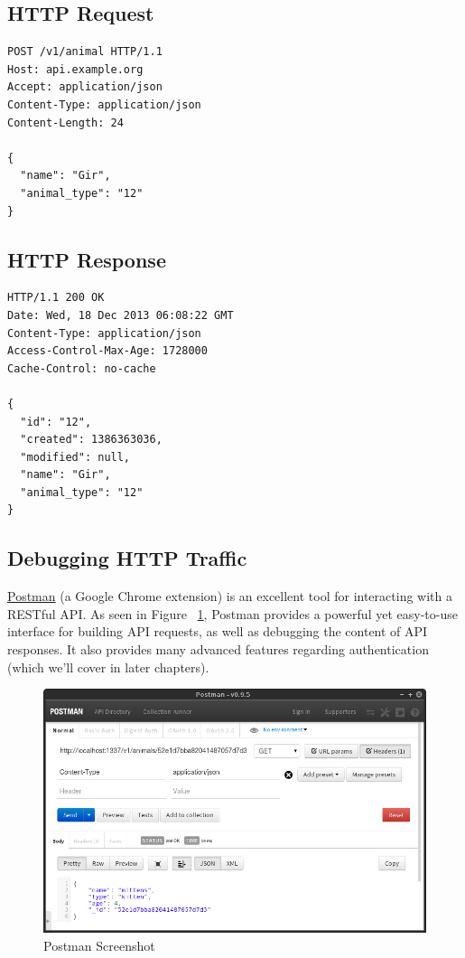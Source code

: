 \documentclass{book}
\begin{document}
\subsection{HTTP Request}

\begin{verbatim}
POST /v1/animal HTTP/1.1
Host: api.example.org
Accept: application/json
Content-Type: application/json
Content-Length: 24

{
  "name": "Gir",
  "animal_type": "12"
}
\end{verbatim}

\subsection{HTTP Response}

\begin{verbatim}
HTTP/1.1 200 OK
Date: Wed, 18 Dec 2013 06:08:22 GMT
Content-Type: application/json
Access-Control-Max-Age: 1728000
Cache-Control: no-cache

{
  "id": "12",
  "created": 1386363036,
  "modified": null,
  "name": "Gir",
  "animal_type": "12"
}
\end{verbatim}

\subsection{Debugging HTTP Traffic}

\href{http://getpostman.com/}{Postman} (a Google Chrome extension) is an excellent tool for interacting with a RESTful API. As seen in Figure ~\ref{fig:postman}, Postman provides a powerful yet easy-to-use interface for building API requests, as well as debugging the content of API responses. It also provides many advanced features regarding authentication (which we'll cover in later chapters).

\begin{figure}[ht!]
\centering
\includegraphics[width=140mm]{images/postman.png}
\caption{Postman Screenshot}
\label{fig:postman}
\end{figure}
\end{document}
